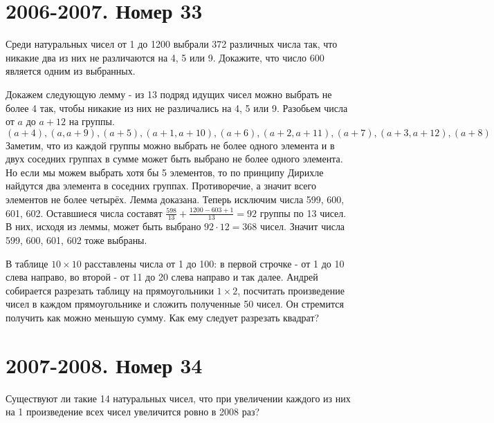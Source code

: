\documentclass[11pt, a4paper]{common/document_template}
\begin{document}
\chapter{2006-2007. Номер 33}

\begin{exercise}
Среди натуральных чисел от 1 до 1200 выбрали 372 различных числа так, что никакие два из них не различаются на 4, 5 или 9. Докажите, что число 600 является одним из выбранных.
\end{exercise}

\begin{Solution}
Докажем следующую лемму - из 13 подряд идущих чисел можно выбрать не более 4 так, чтобы никакие из них не различались на 4, 5 или 9. Разобьем числа от $a$ до $a + 12$ на группы.
$$
(a + 4), (a, a + 9), (a + 5), (a + 1, a + 10), (a + 6), (a + 2, a + 11), (a + 7), (a + 3, a + 12), (a + 8) 
$$
Заметим, что из каждой группы можно выбрать не более одного элемента и в двух соседних группах в сумме может быть выбрано не более одного элемента. Но если мы можем выбрать хотя бы 5 элементов, то по принципу Дирихле найдутся два элемента в соседних группах. Противоречие, а значит всего элементов не более четырёх. Лемма доказана. Теперь исключим числа 599, 600, 601, 602. Оставшиеся числа составят $\frac{598}{13} + \frac{1200 - 603 + 1}{13} = 92$ группы по 13 чисел.  В них, исходя из леммы, может быть выбрано $92 \cdot 12 = 368$ чисел. Значит числа 599, 600, 601, 602 тоже выбраны. 
\end{Solution}

\begin{exercise}
В таблице $10 \times 10$ расставлены числа от 1 до 100: в первой строчке - от 1 до 10 слева направо, во второй - от 11 до 20 слева направо
и так далее. Андрей собирается разрезать таблицу на прямоугольники $1 \times 2$, посчитать произведение чисел в каждом прямоугольнике и сложить полученные 50 чисел. Он стремится получить как можно меньшую сумму. Как ему следует разрезать квадрат?
\end{exercise}

\chapter{2007-2008. Номер 34}

\begin{exercise}
Существуют ли такие 14 натуральных чисел, что при увеличении каждого из них на 1 произведение всех чисел увеличится ровно в 2008 раз?
\end{exercise}
\end{document}
